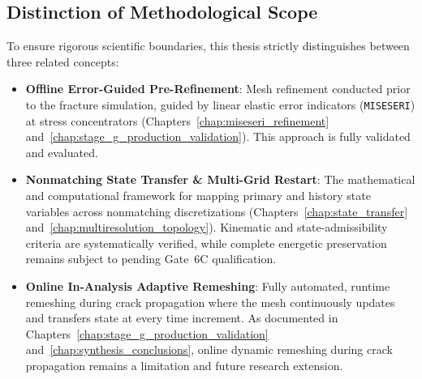 \subsection{Distinction of Methodological Scope}
To ensure rigorous scientific boundaries, this thesis strictly distinguishes between three related concepts:
\begin{itemize}
    \item \textbf{Offline Error-Guided Pre-Refinement}: Mesh refinement conducted prior to the fracture simulation, guided by linear elastic error indicators (\texttt{MISESERI}) at stress concentrators (Chapters~\ref{chap:miseseri_refinement} and~\ref{chap:stage_g_production_validation}). This approach is fully validated and evaluated.
    \item \textbf{Nonmatching State Transfer \& Multi-Grid Restart}: The mathematical and computational framework for mapping primary and history state variables across nonmatching discretizations (Chapters~\ref{chap:state_transfer} and~\ref{chap:multiresolution_topology}). Kinematic and state-admissibility criteria are systematically verified, while complete energetic preservation remains subject to pending Gate~6C qualification.
    \item \textbf{Online In-Analysis Adaptive Remeshing}: Fully automated, runtime remeshing during crack propagation where the mesh continuously updates and transfers state at every time increment. As documented in Chapters~\ref{chap:stage_g_production_validation} and~\ref{chap:synthesis_conclusions}, online dynamic remeshing during crack propagation remains a limitation and future research extension.
\end{itemize}

